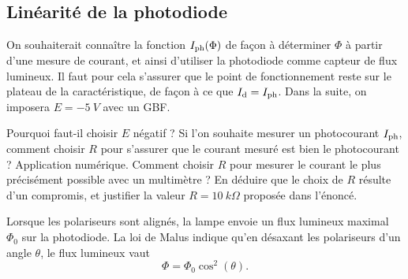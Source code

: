 \subsection{Linéarité de la photodiode}


On souhaiterait connaître la fonction $I_{\rm ph}(\Phi)$ de façon à déterminer $\Phi$ à partir d’une mesure de courant, et ainsi d’utiliser la photodiode comme capteur de flux lumineux. Il faut pour cela s’assurer que le point de fonctionnement reste sur le plateau de la caractéristique, de façon à ce que $I_{\rm d} = I_{\rm ph}$.
Dans la suite, on imposera $E=-\SI{5}{V}$ avec un GBF.

\begin{protocole}
\todo Pourquoi faut-il choisir $E$ négatif ? Si l’on souhaite mesurer un photocourant $I_{\rm ph}$, comment choisir $R$ pour s’assurer que le courant mesuré est bien le photocourant ? Application numérique.
\todo Comment choisir $R$ pour mesurer le courant le plus précisément possible avec un multimètre ? En déduire que le choix de $R$ résulte d’un compromis, et justifier la valeur $R=\SI{10}{k\Omega}$ proposée dans l’énoncé.
\end{protocole}

Lorsque les polariseurs sont alignés, la lampe envoie un flux lumineux maximal~$\Phi_0$ sur la photodiode. La loi de Malus indique qu’en désaxant les polariseurs d’un angle $\theta$, le flux lumineux %
vaut
\begin{equation}
\Phi = \Phi_0 \cos^2(\theta).
\end{equation}

